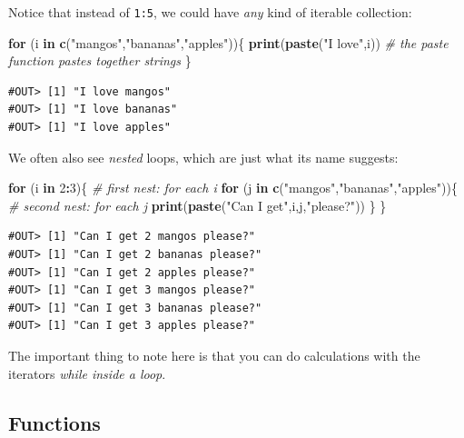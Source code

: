\documentclass[]{book}
\newenvironment{Shaded}{\begin{snugshade}}{\end{snugshade}}
\newcommand{\KeywordTok}[1]{\textcolor[rgb]{0.13,0.29,0.53}{\textbf{#1}}}
\newcommand{\DecValTok}[1]{\textcolor[rgb]{0.00,0.00,0.81}{#1}}
\newcommand{\StringTok}[1]{\textcolor[rgb]{0.31,0.60,0.02}{#1}}
\newcommand{\CommentTok}[1]{\textcolor[rgb]{0.56,0.35,0.01}{\textit{#1}}}
\newcommand{\ControlFlowTok}[1]{\textcolor[rgb]{0.13,0.29,0.53}{\textbf{#1}}}
\newcommand{\OperatorTok}[1]{\textcolor[rgb]{0.81,0.36,0.00}{\textbf{#1}}}
\newcommand{\NormalTok}[1]{#1}
\begin{document}
Notice that instead of \texttt{1:5}, we could have \emph{any} kind of
iterable collection:

\begin{Shaded}
\begin{Highlighting}[]
\ControlFlowTok{for}\NormalTok{ (i }\ControlFlowTok{in} \KeywordTok{c}\NormalTok{(}\StringTok{"mangos"}\NormalTok{,}\StringTok{"bananas"}\NormalTok{,}\StringTok{"apples"}\NormalTok{))\{}
  \KeywordTok{print}\NormalTok{(}\KeywordTok{paste}\NormalTok{(}\StringTok{"I love"}\NormalTok{,i))  }\CommentTok{# the paste function pastes together strings}
\NormalTok{\}}
\end{Highlighting}
\end{Shaded}

\begin{verbatim}
#OUT> [1] "I love mangos"
#OUT> [1] "I love bananas"
#OUT> [1] "I love apples"
\end{verbatim}

We often also see \emph{nested} loops, which are just what its name
suggests:

\begin{Shaded}
\begin{Highlighting}[]
\ControlFlowTok{for}\NormalTok{ (i }\ControlFlowTok{in} \DecValTok{2}\OperatorTok{:}\DecValTok{3}\NormalTok{)\{}
  \CommentTok{# first nest: for each i}
  \ControlFlowTok{for}\NormalTok{ (j }\ControlFlowTok{in} \KeywordTok{c}\NormalTok{(}\StringTok{"mangos"}\NormalTok{,}\StringTok{"bananas"}\NormalTok{,}\StringTok{"apples"}\NormalTok{))\{}
    \CommentTok{# second nest: for each j}
    \KeywordTok{print}\NormalTok{(}\KeywordTok{paste}\NormalTok{(}\StringTok{"Can I get"}\NormalTok{,i,j,}\StringTok{"please?"}\NormalTok{))}
\NormalTok{  \}}
\NormalTok{\}}
\end{Highlighting}
\end{Shaded}

\begin{verbatim}
#OUT> [1] "Can I get 2 mangos please?"
#OUT> [1] "Can I get 2 bananas please?"
#OUT> [1] "Can I get 2 apples please?"
#OUT> [1] "Can I get 3 mangos please?"
#OUT> [1] "Can I get 3 bananas please?"
#OUT> [1] "Can I get 3 apples please?"
\end{verbatim}

The important thing to note here is that you can do calculations with
the iterators \emph{while inside a loop}.

\subsection{Functions}\label{functions}
\end{document}
